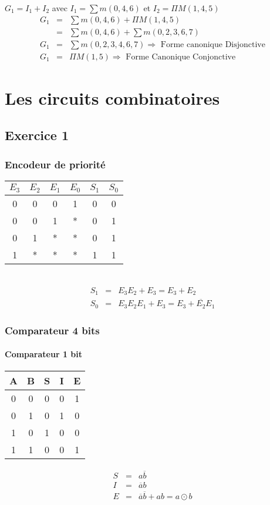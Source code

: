 \documentclass[12pt,a4paper,openany]{book}
\begin{document}
	\subsection{}
	$G_1 = I_1 + I_2$ avec $I_1 = \sum m (0,4,6)$ et $I_2 = \Pi M(1,4,5)$
	\begin{eqnarray*}
		G_1 &=& \sum m(0,4,6) + \Pi M(1,4,5)\\
		&=& \sum m(0,4,6) + \sum m (0,2,3,6,7)\\
		G_1 &=& \sum m (0,2,3,4,6,7) \Rightarrow \textrm{ Forme canonique Disjonctive}\\
		G_1 &=& \Pi M (1,5) \Rightarrow \textrm{ Forme Canonique Conjonctive}
	\end{eqnarray*}
	
	\chapter{Les circuits combinatoires}
	\section{Exercice 1}
	\subsection{Encodeur de priorité}
	\begin{tabular}{cccc||cc}
		$E_3$ & $E_2$ & $E_1$ & $E_0$ & $S_1$ & $S_0$\\
		\hline
		0&0&0&1&0&0\\
		0&0&1&*&0&1\\
		0&1&*&*&0&1\\
		1&*&*&*&1&1\\
	\end{tabular}\\
	\begin{eqnarray*}
	S_1&=& E_3E_2+E_3=E_3+E_2\\
	S_0 &=& E_3E_2E_1+E_3 = E_3+\overline{E_2} E_1
	\end{eqnarray*}
	\subsection{Comparateur 4 bits}
	\subsubsection{Comparateur 1 bit}
		\begin{tabular}{cc||ccc}
			A & B & S & I & E\\
			\hline
			0&0&0&0&1\\
			0&1&0&1&0\\
			1&0&1&0&0\\
			1&1&0&0&1
		\end{tabular}
		\begin{eqnarray*}
			S&=& a\overline b\\
			I&=& \overline a b\\
			E&=& \overline a \overline b + ab = a \odot b
		\end{eqnarray*}
\end{document}
